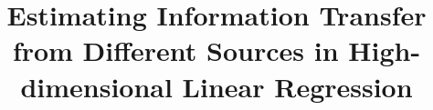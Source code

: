 \documentclass{article}
\begin{document}
	\title{Estimating Information Transfer from Different Sources in High-dimensional Linear Regression}
	

	\maketitle
	
	
	
	
	
    
	
	
	
\end{document}
